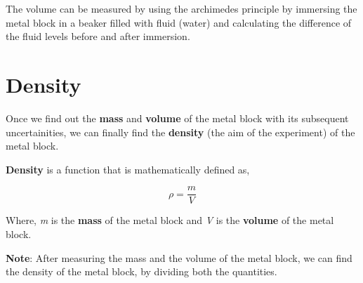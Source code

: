 		{The volume can be measured by using the archimedes principle by immersing the metal block in a beaker filled with fluid (water) and calculating the difference of the fluid levels before and after immersion.}
		
\section{{Density}}
        
    {Once we find out the \textbf{mass} and \textbf{volume} of the metal block with its subsequent uncertainities, we can finally find the \textbf{density} (the aim of the experiment) of the metal block.}
        
    {\textbf{Density} is a function that is mathematically defined as,}
        
    $$\rho = \frac{m}{V}$$
        
    {Where, \textit{m} is the \textbf{mass} of the metal block and \textit{V} is the \textbf{volume} of the metal block.}
        
	{\textbf{Note}: After measuring the mass and the volume of the metal block, we can find the density of the metal block, by dividing both the quantities.}   


